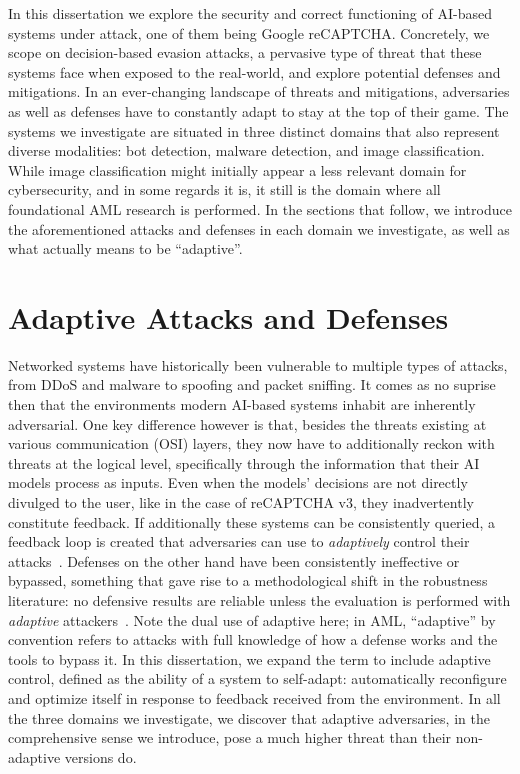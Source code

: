 In this dissertation we explore the security and correct functioning of AI-based systems under attack, one of them being Google reCAPTCHA.
Concretely, we scope on decision-based evasion attacks, a pervasive type of threat that these systems face when exposed to the real-world, and explore potential defenses and mitigations.
In an ever-changing landscape of threats and mitigations, adversaries as well as defenses have to constantly adapt to stay at the top of their game.
The systems we investigate are situated in three distinct domains that also represent diverse modalities: bot detection, malware detection, and image classification.
While image classification might initially appear a less relevant domain for cybersecurity, and in some regards it is, it still is the domain where all foundational \gls{AML} research is performed.
In the sections that follow, we introduce the aforementioned attacks and defenses in each domain we investigate, as well as what actually means to be ``adaptive''.

\section{Adaptive Attacks and Defenses}

Networked systems have historically been vulnerable to multiple types of attacks, from DDoS and malware to spoofing and packet sniffing.
It comes as no suprise then that the environments modern AI-based systems inhabit are inherently adversarial.
One key difference however is that, besides the threats existing at various communication (\gls{OSI}) layers, they now have to additionally reckon with threats at the logical level, specifically through the information that their \gls{AI} models process as inputs.
Even when the models' decisions are not directly divulged to the user, like in the case of reCAPTCHA v3, they inadvertently constitute feedback.
If additionally these systems can be consistently queried, a feedback loop is created that adversaries can use to \textit{adaptively} control their attacks~\cite{astrom1995adaptive}.
Defenses on the other hand have been consistently ineffective or bypassed, something that gave rise to a methodological shift in the robustness literature: no defensive results are reliable unless the evaluation is performed with \textit{adaptive} attackers~\cite{madry2017towards}.
Note the dual use of adaptive here; in \gls{AML}, “adaptive” by convention refers to attacks with full knowledge of how a defense works and the tools to bypass it.
In this dissertation, we expand the term to include adaptive control, defined as the ability of a system to self-adapt: automatically reconfigure and optimize itself in response to feedback received from the environment.
In all the three domains we investigate, we discover that adaptive adversaries, in the comprehensive sense we introduce, pose a much higher threat than their non-adaptive versions do.

